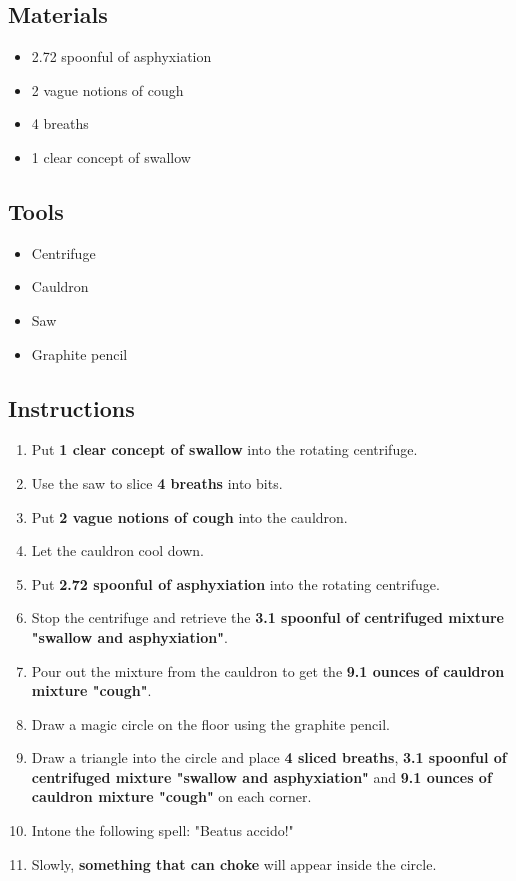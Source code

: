 \documentclass{article}
\begin{document}
\subsection{Materials}\begin{itemize}
\item 
2.72 spoonful of asphyxiation
\item 
2 vague notions of cough
\item 
4 breaths
\item 
1 clear concept of swallow
\end{itemize}
\subsection{Tools}\begin{itemize}
\item 
Centrifuge
\item 
Cauldron
\item 
Saw
\item 
Graphite pencil
\end{itemize}
\subsection{Instructions}\begin{enumerate}
\item 
Put \textbf{1 clear concept of swallow} into the rotating centrifuge.
\item 
Use the saw to slice \textbf{4 breaths} into bits.
\item 
Put \textbf{2 vague notions of cough} into the cauldron.
\item 
Let the cauldron cool down.
\item 
Put \textbf{2.72 spoonful of asphyxiation} into the rotating centrifuge.
\item 
Stop the centrifuge and retrieve the \textbf{3.1 spoonful of centrifuged mixture "swallow and asphyxiation"}.
\item 
Pour out the mixture from the cauldron to get the \textbf{9.1 ounces of cauldron mixture "cough"}.
\item 
Draw a magic circle on the floor using the graphite pencil.
\item 
Draw a triangle into the circle and place \textbf{4 sliced breaths}, \textbf{3.1 spoonful of centrifuged mixture "swallow and asphyxiation"} and \textbf{9.1 ounces of cauldron mixture "cough"} on each corner.
\item 
Intone the following spell: "Beatus accido!"
\item 
Slowly, \textbf{something that can choke} will appear inside the circle.
\end{enumerate}
\newpage
\end{document}
